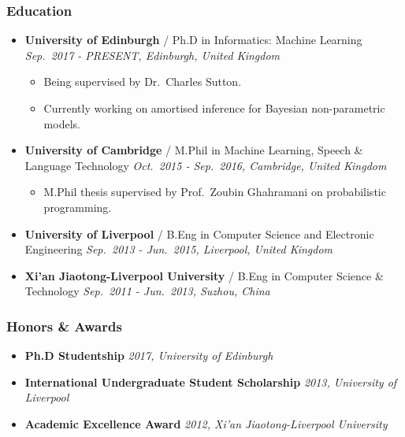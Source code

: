 \documentclass[11pt, a4paper]{article}
\providecommand{\tightlist}{%
  \setlength{\itemsep}{0pt}\setlength{\parskip}{0pt}}
\begin{document}
\begin{raggedright}
\subsubsection{Education}

\begin{itemize}
\tightlist
\item
  \textbf{University of Edinburgh} / Ph.D in Informatics: Machine
  Learning \emph{Sep.~2017 - PRESENT, Edinburgh, United Kingdom}

  \begin{itemize}
  \tightlist
  \item
    Being supervised by Dr.~Charles Sutton.
  \item
    Currently working on amortised inference for Bayesian non-parametric
    models.
  \end{itemize}
\item
  \textbf{University of Cambridge} / M.Phil in Machine Learning, Speech
  \& Language Technology \emph{Oct.~2015 - Sep.~2016, Cambridge, United
  Kingdom}

  \begin{itemize}
  \tightlist
  \item
    M.Phil thesis supervised by Prof.~Zoubin Ghahramani on probabilistic
    programming.
  \end{itemize}
\item
  \textbf{University of Liverpool} / B.Eng in Computer Science and
  Electronic Engineering \emph{Sep.~2013 - Jun.~2015, Liverpool, United
  Kingdom}
\item
  \textbf{Xi'an Jiaotong-Liverpool University} / B.Eng in Computer
  Science \& Technology \emph{Sep.~2011 - Jun.~2013, Suzhou, China}
\end{itemize}

\subsubsection{Honors \& Awards}

\begin{itemize}
\tightlist
\item
  \textbf{Ph.D Studentship} \emph{2017, University of Edinburgh}
\item
  \textbf{International Undergraduate Student Scholarship} \emph{2013,
  University of Liverpool}
\item
  \textbf{Academic Excellence Award} \emph{2012, Xi'an
  Jiaotong-Liverpool University}
\end{itemize}


\end{raggedright}
\end{document}
